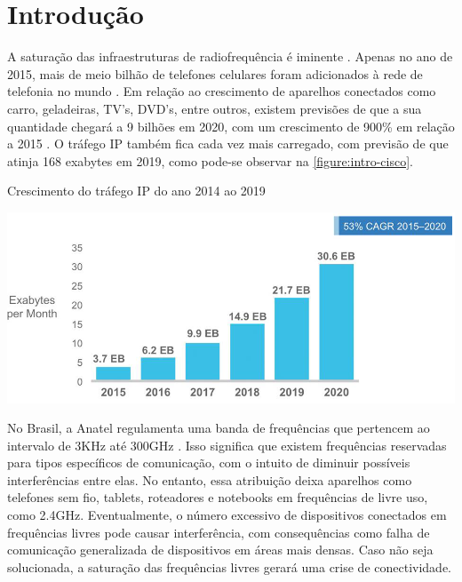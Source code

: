 	\chapter*[Introdução]{Introdução} %
		
	A saturação das infraestruturas de radiofrequência é iminente \cite{load-balancing}. Apenas no ano de 2015, mais de meio bilhão de telefones celulares foram adicionados à rede de telefonia no mundo \cite{cisco-forecast}. Em relação ao crescimento de aparelhos conectados como carro, geladeiras, TV’s, DVD’s, entre outros, existem previsões de que a sua quantidade chegará a 9 bilhões em 2020, com um crescimento de 900\% em relação a 2015 \cite{erricson-report}. O tráfego IP também fica cada vez mais carregado, com previsão de que atinja 168 exabytes em 2019, como pode-se observar na \autoref{figure:intro-cisco}.
	
	\begin{chart}[ht!]
		\caption{\label{figure:intro-cisco}Crescimento do tráfego IP do ano 2014 ao 2019}
		\begin{center}
			\includegraphics[scale=0.5]{cisco_exabytes_per_month.png}
		\end{center}
	\end{chart}
	
	No Brasil, a Anatel regulamenta uma banda de frequências que pertencem ao intervalo  de 3KHz até 300GHz \cite{faixa-anatel}. Isso significa que existem frequências reservadas para tipos específicos de comunicação, com o intuito de diminuir possíveis interferências entre elas. No entanto, essa atribuição deixa aparelhos como telefones sem fio, tablets, roteadores e notebooks em frequências de livre uso, como 2.4GHz. Eventualmente, o número excessivo de dispositivos conectados em  frequências livres pode causar interferência, com consequências como falha de comunicação generalizada de dispositivos em áreas mais densas. Caso não seja solucionada, a saturação das frequências livres gerará uma crise de conectividade. \par 
	

